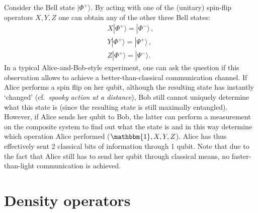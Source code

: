     \begin{method}
        Consider the Bell state $|\Phi^+\rangle$. By acting with one of the (unitary) spin-flip operators $X,Y,Z$ one can obtain any of the other three Bell states:
        \begin{gather}
            X|\Phi^+\rangle = |\Phi^-\rangle\,,\nonumber\\
            Y|\Phi^+\rangle = |\Psi^+\rangle\,,\\
            Z|\Phi^+\rangle = |\Psi^-\rangle.\nonumber
        \end{gather}
        In a typical Alice-and-Bob-style experiment, one can ask the question if this observation allows to achieve a better-than-classical communication channel. If Alice performs a spin flip on her qubit, although the resulting state has instantly `changed' (cf.~\textit{spooky action at a distance}), Bob still cannot uniquely determine what this state is (since the resulting state is still maximally entangled). However, if Alice sends her qubit to Bob, the latter can perform a measurement on the composite system to find out what the state is and in this way determine which operation Alice performed ($\mathbbm{1},X,Y,Z$). Alice has thus effectively sent 2 classical bits of information through 1 qubit. Note that due to the fact that Alice still has to send her qubit through classical means, no faster-than-light communication is achieved.
    \end{method}


\section{Density operators}


